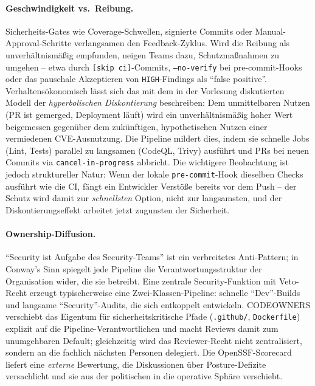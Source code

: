 \documentclass[12pt, a4paper]{scrartcl}
\begin{document}
\paragraph{Geschwindigkeit vs.\ Reibung.}
Sicherheits-Gates wie Coverage-Schwellen, signierte Commits oder
Manual-Approval-Schritte verlangsamen den Feedback-Zyklus. Wird die
Reibung als unverhältnismäßig empfunden, neigen Teams dazu,
Schutzmaßnahmen zu umgehen -- etwa durch \texttt{[skip ci]}-Commits,
\texttt{--no-verify} bei pre-commit-Hooks oder das pauschale
Akzeptieren von \texttt{HIGH}-Findings als \enquote{false positive}.
Verhaltensökonomisch lässt sich das mit dem in der Vorlesung
diskutierten Modell der \emph{hyperbolischen Diskontierung}
beschreiben: Dem unmittelbaren Nutzen (PR ist gemerged,
Deployment läuft) wird ein unverhältnismäßig hoher Wert beigemessen
gegenüber dem zukünftigen, hypothetischen Nutzen einer vermiedenen
CVE-Ausnutzung. Die Pipeline mildert dies, indem sie schnelle Jobs
(Lint, Tests) parallel zu langsamen (CodeQL, Trivy) ausführt und PRs
bei neuen Commits via \texttt{cancel-in-progress} abbricht. Die
wichtigere Beobachtung ist jedoch struktureller Natur: Wenn der
lokale \texttt{pre-commit}-Hook dieselben Checks ausführt wie die CI,
fängt ein Entwickler Verstöße bereits vor dem Push -- der Schutz wird
damit zur \emph{schnellsten} Option, nicht zur langsamsten, und der
Diskontierungseffekt arbeitet jetzt zugunsten der Sicherheit.

\paragraph{Ownership-Diffusion.}
\enquote{Security ist Aufgabe des Security-Teams} ist ein verbreitetes
Anti-Pattern; in Conway's Sinn spiegelt jede Pipeline die
Verantwortungsstruktur der Organisation wider, die sie betreibt. Eine
zentrale Security-Funktion mit Veto-Recht erzeugt typischerweise eine
Zwei-Klassen-Pipeline: schnelle \enquote{Dev}-Builds und langsame
\enquote{Security}-Audits, die sich entkoppelt entwickeln. CODEOWNERS
verschiebt das Eigentum für sicherheits\-kritische Pfade
(\texttt{.github/}, \texttt{Dockerfile}) explizit auf die
Pipeline-Verantwortlichen und macht Reviews damit zum unumgehbaren
Default; gleichzeitig wird das Reviewer-Recht nicht zentralisiert,
sondern an die fachlich nächsten Personen delegiert. Die
OpenSSF-Scorecard liefert eine \emph{externe} Bewertung, die
Diskussionen über Posture-Defizite versachlicht und sie aus der
politischen in die operative Sphäre verschiebt.
\end{document}
